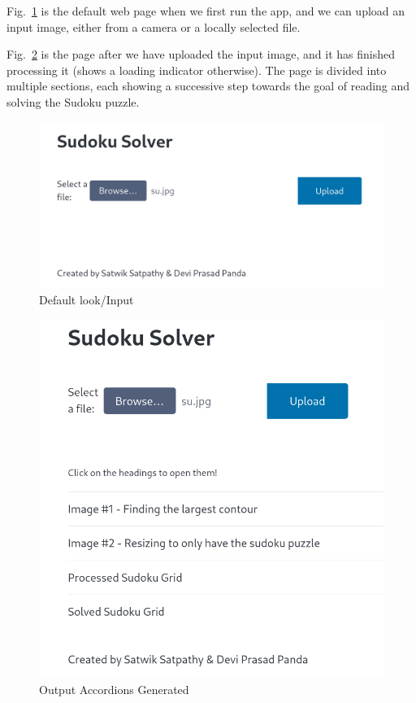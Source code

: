 \documentclass[conference]{IEEEtran}
\begin{document}
Fig.~\ref{input} is the default web page when we first run the app, and we can upload an input image, either from a camera or a locally selected file.

Fig.~\ref{generated_output} is the page after we have uploaded the input image, and it has finished processing it (shows a loading indicator otherwise). The page is divided into multiple sections, each showing a successive step towards the goal of reading and solving the Sudoku puzzle.

\begin{figure}[htbp]
\centerline{\includegraphics[scale=0.2]{assets/result-input/test1/1.png}}
\caption{Default look/Input}
\label{input}
\end{figure}

\begin{figure}[htbp]
\centerline{\includegraphics[scale=0.3]{assets/result-input/test1/3.png}}
\caption{Output Accordions Generated}
\label{generated_output}
\end{figure}
\end{document}
